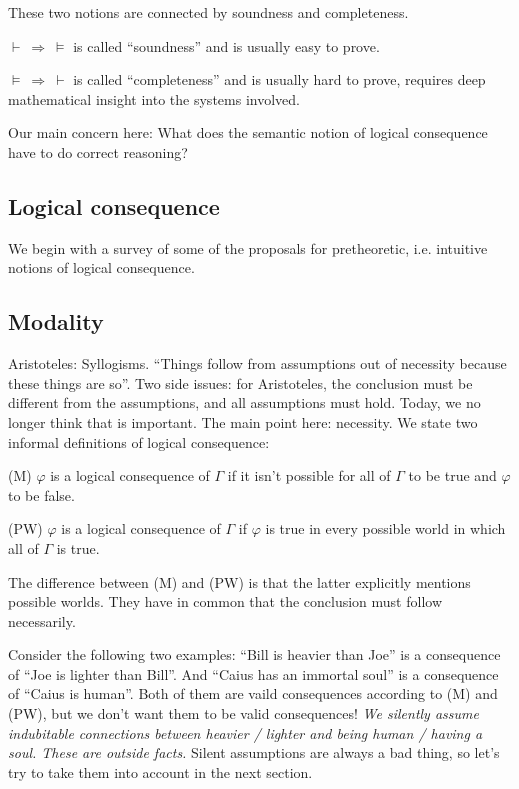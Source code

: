 \documentclass[a4paper]{article}
\newcommand{\Arr}{\Rightarrow}
\begin{document}
These two notions are connected by soundness and completeness.

$\vdash\ \Arr\ \models$ is called ``soundness'' and is usually easy to prove.

$\models\ \Arr\ \vdash$ is called ``completeness'' and is usually hard to prove,
requires deep mathematical insight into the systems involved.

Our main concern here: What does the semantic notion of logical consequence have
to do correct reasoning?

\subsection{Logical consequence}

We begin with a survey of some of the proposals for pretheoretic, i.e. intuitive
notions of logical consequence.

\subsection{Modality}

Aristoteles: Syllogisms.  ``Things follow from assumptions out of necessity
because these things are so''.  Two side issues: for Aristoteles, the conclusion
must be different from the assumptions, and all assumptions must hold.  Today,
we no longer think that is important.  The main point here: necessity.  We state
two informal definitions of logical consequence:

(M) $\varphi$ is a logical consequence of $\Gamma$ if it isn't possible for all
of $\Gamma$ to be true and $\varphi$ to be false.

(PW) $\varphi$ is a logical consequence of $\Gamma$ if $\varphi$ is true in
every possible world in which all of $\Gamma$ is true.

The difference between (M) and (PW) is that the latter explicitly mentions
possible worlds.  They have in common that the conclusion must follow
necessarily.

Consider the following two examples:  ``Bill is heavier than Joe'' is a
consequence of ``Joe is lighter than Bill''. And ``Caius has an immortal soul''
is a consequence of ``Caius is human''.  Both of them are vaild consequences
according to (M) and (PW), but we don't want them to be valid consequences!
\emph{We silently assume indubitable connections between heavier / lighter and
being human / having a soul.  These are outside facts.}  Silent assumptions are
always a bad thing, so let's try to take them into account in the next section.
\end{document}
